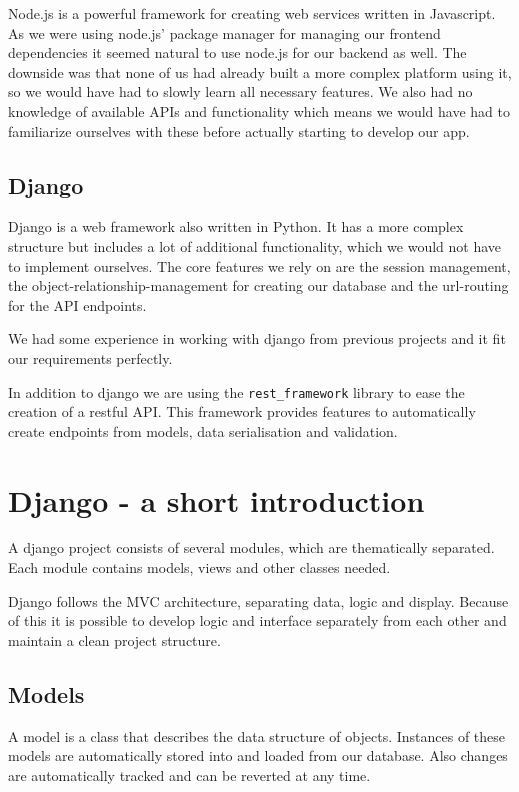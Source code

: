 Node.js is a powerful framework for creating web services written in
Javascript. As we were using node.js' package manager for managing our
frontend dependencies it seemed natural to use node.js for our backend
as well. The downside was that none of us had already built a more
complex platform using it, so we would have had to slowly learn all
necessary features. We also had no knowledge of available APIs and
functionality which means we would have had to familiarize ourselves
with these before actually starting to develop our app.

\subsection{Django}\label{django}

Django is a web framework also written in Python. It has a more complex
structure but includes a lot of additional functionality, which we would
not have to implement ourselves. The core features we rely on are the
session management, the object-relationship-management for creating our
database and the url-routing for the API endpoints.

We had some experience in working with django from previous projects and
it fit our requirements perfectly.

In addition to django we are using the \texttt{rest\_framework} library
to ease the creation of a restful API. This framework provides features
to automatically create endpoints from models, data serialisation and
validation.

\newpage
\section{Django - a short
introduction}\label{django---a-short-introduction}

A django project consists of several modules, which are thematically
separated. Each module contains models, views and other classes needed.

Django follows the MVC architecture, separating data, logic and display.
Because of this it is possible to develop logic and interface separately
from each other and maintain a clean project structure.

\subsection{Models}\label{models-1}

A model is a class that describes the data structure of objects.
Instances of these models are automatically stored into and loaded from
our database. Also changes are automatically tracked and can be reverted
at any time.

